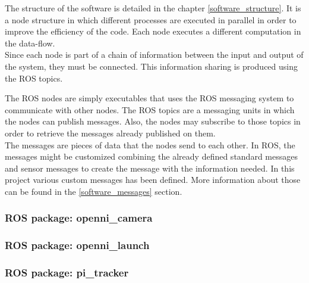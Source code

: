 The structure of the software is detailed in the chapter \ref{software_structure}.  It is a node structure in which different processes are executed in parallel in order to improve the efficiency of the code. Each node executes a different computation in the data-flow. 
\\

Since each node is part of a chain of information between the input and output of the system, they must be connected. This information sharing is produced using the ROS topics. 


The ROS nodes are simply executables that uses the ROS messaging system to communicate with other nodes. The ROS topics are a messaging units in which the nodes can publish messages. Also, the nodes may subscribe to those topics in order to retrieve the messages already published on them. 
\\

The messages are pieces of data that the nodes send to each other. In ROS, the messages might be customized combining the already defined standard messages and sensor messages to create the message with the information needed. In this project various custom messages has been defined. More information about those can be found in the \ref{software_messages} section. 


\subsubsection{ROS package: openni\_camera}

\subsubsection{ROS package: openni\_launch}

\subsubsection{ROS package: pi\_tracker}

